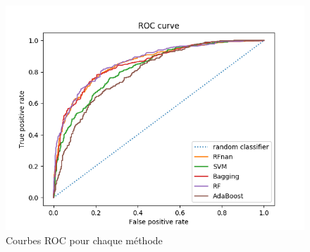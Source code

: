 \documentclass[12pt]{article}
\begin{document}

\begin{figure}[H]
    \center
    \includegraphics[width=\textwidth]{images/ROC_curves.png}
    \caption{Courbes ROC pour chaque méthode}
    \label{img:roc-curves}
\end{figure}





\newpage
\printbibliography
\end{document}

